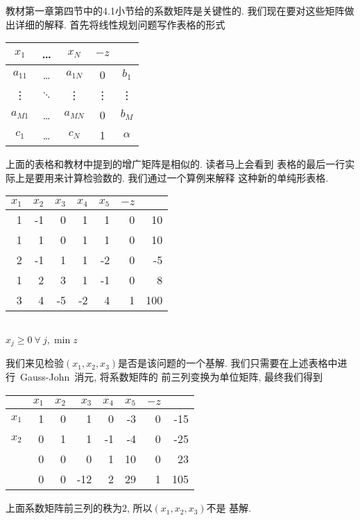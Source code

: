 \documentclass[a4paper,12pt]{article}
\begin{document}
\begin{CJK*}{UTF8}{gbsn}
教材\cite{or}第一章第四节中的4.1小节给的系数矩阵是关键性的. 
我们现在要对这些矩阵做出详细的解释. 首先将线性规划问题写作表格的形式
\begin{center}
\begin{tabular}{c c c c|c}
\hline
$x_{1}$ & \dots & $x_{N}$ & $-z$ &  \\
\hline
$a_{11}$ & \dots & $a_{1N}$ & 0 & $b_{1}$\\
\vdots  & $\ddots$ & \vdots  & \vdots & \vdots \\
$a_{M1}$ & \dots & $a_{MN}$ & 0 & $b_{M}$\\
\hline
$c_{1}$ & \dots & $c_{N}$ & 1 &  $\alpha$\\
\hline
\end{tabular}
\end{center}
上面的表格和教材\cite{or}中提到的增广矩阵是相似的. 读者马上会看到
表格的最后一行实际上是要用来计算检验数的. 我们通过一个算例来解释
这种新的单纯形表格. 
\begin{center}
\begin{tabular}{r r r r r r|r}
\hline
$x_{1}$ & $x_{2}$ & $x_{3}$ & $x_{4}$ & $x_{5}$ & $-z$ &  \\
\hline
1 & -1 & 0 & 1 & 1 & 0 & 10\\
1 &  1 & 0 & 1 & 1 & 0 & 10\\
2 & -1 & 1 & 1 & -2 & 0 & -5\\
1 & 2 & 3 & 1 & -1 & 0 & 8\\
\hline
3 & 4 & -5 & -2 & 4 & 1 & 100\\
\hline
\end{tabular}\\
$x_{j} \geq 0~\forall~j, \min z$
\end{center}
我们来见检验$(x_{1}, x_{2}, x_{3})$是否是该问题的一个基解. 
我们只需要在上述表格中进行~Gauss-John~消元, 将系数矩阵的
前三列变换为单位矩阵, 最终我们得到
\begin{center}
\begin{tabular}{r r r r r r r|r}
\hline
 & $x_{1}$ & $x_{2}$ & $x_{3}$ & $x_{4}$ & $x_{5}$ & $-z$ &  \\
\hline
$x_{1}$ & 1 &  0 & 1 & 0  & -3 & 0 & -15\\
$x_{2}$ & 0 &  1 & 1 & -1 & -4 & 0 & -25\\
			& 0 &  0 & 0 & 1  & 10 & 0 & 23\\
\hline
			& 0 &  0 & -12 & 2 & 29 & 1 & 105\\
\hline
\end{tabular}
\end{center}
上面系数矩阵前三列的秩为$2$, 所以$(x_{1}, x_{2}, x_{3})$不是
基解. 


\end{CJK*}
\end{document}
